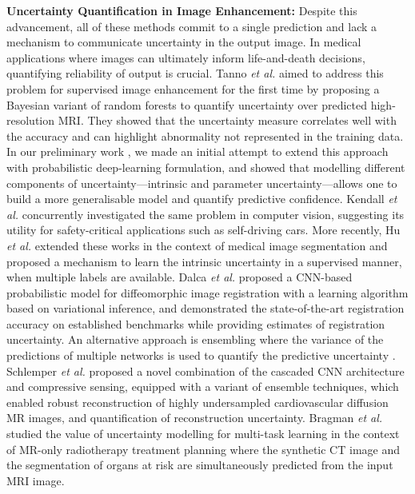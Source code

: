 \textbf{Uncertainty Quantification in Image Enhancement:}
Despite this advancement, all of these methods commit to a single prediction and lack a mechanism to communicate uncertainty in the output image.  In medical applications where images can ultimately inform life-and-death decisions, quantifying reliability of output is crucial. Tanno \emph{et al.} \cite{tanno2016bayesian} aimed to address this problem for supervised image enhancement for the first time by proposing a Bayesian variant of random forests to quantify uncertainty over predicted high-resolution MRI. They showed that the uncertainty measure correlates well with the accuracy and can highlight abnormality not represented in the training data. In our preliminary work \cite{tanno2017bayesian}, we made an initial attempt
to extend this approach with probabilistic deep-learning formulation, and showed that modelling different components of uncertainty---intrinsic and parameter uncertainty---allows one to build a more generalisable model and quantify predictive confidence. Kendall \emph{et al.} \cite{kendall2017uncertainties} concurrently investigated the same problem in computer vision, suggesting its utility for safety-critical applications such as self-driving cars. More recently, Hu \emph{et al.}\cite{hu2019uncertainty} extended these works in the context of medical image segmentation and proposed a mechanism to learn the intrinsic uncertainty in a supervised manner, when multiple labels are available. Dalca \emph{et al.} \cite{dalca2018unsupervised} proposed a CNN-based probabilistic model for diffeomorphic image registration with a learning algorithm based on variational inference, and demonstrated the state-of-the-art registration accuracy on established benchmarks while providing estimates of registration uncertainty. An alternative approach is ensembling where the variance of the predictions of multiple networks is used to quantify the predictive uncertainty \cite{lakshminarayanan2017simple}. Schlemper \emph{et al.} \cite{schlemper2018stochastic} proposed a novel combination of the cascaded CNN architecture and compressive sensing, equipped with a variant of ensemble techniques, which enabled robust reconstruction of highly undersampled cardiovascular diffusion MR images, and quantification of reconstruction uncertainty. Bragman \emph{et al.} \cite{bragman2018uncertainty} studied the value of uncertainty modelling for multi-task learning in the context of MR-only radiotherapy treatment planning where the synthetic CT image and the segmentation of organs at risk are simultaneously predicted from the input MRI image.  

